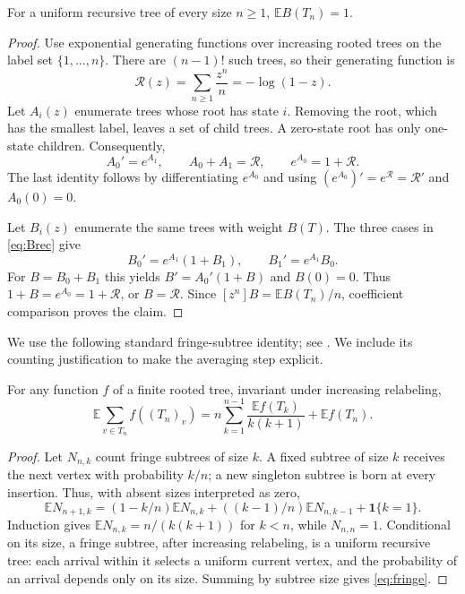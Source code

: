 \documentclass[runningheads,envcountsame,orivec]{llncs}
\newcommand{\E}{\mathbb E}
\newcommand{\ind}{\mathbf 1}
\newcommand{\R}{\mathcal R}
\begin{document}
\begin{lemma}\label{lem:influence}
For a uniform recursive tree of every size $n\ge1$, $\E B(T_n)=1$.
\end{lemma}
\begin{proof}
Use exponential generating functions over increasing rooted trees on
the label set $\{1,\ldots,n\}$. There are $(n-1)!$ such trees, so their
generating function is
\[
 \R(z)=\sum_{n\ge1}\frac{z^n}{n}=-\log(1-z).
\]
Let $A_i(z)$ enumerate trees whose root has state $i$. Removing the
root, which has the smallest label, leaves a set of child trees. A
zero-state root has only one-state children. Consequently,
\begin{equation}\label{eq:A}
 A_0'=e^{A_1},\qquad A_0+A_1=\R,
 \qquad e^{A_0}=1+\R.
\end{equation}
The last identity follows by differentiating $e^{A_0}$ and using
$(e^{A_0})'=e^{\R}=\R'$ and $A_0(0)=0$.

Let $B_i(z)$ enumerate the same trees with weight $B(T)$. The three
cases in \eqref{eq:Brec} give
\[
 B_0'=e^{A_1}(1+B_1),\qquad B_1'=e^{A_1}B_0.
\]
For $B=B_0+B_1$ this yields $B'=A_0'(1+B)$ and $B(0)=0$.
Thus $1+B=e^{A_0}=1+\R$, or $B=\R$. Since
$[z^n]B=\E B(T_n)/n$, coefficient comparison proves the claim.
\end{proof}

We use the following standard fringe-subtree identity; see
\cite{HolmgrenJanson2015}. We include its counting justification to make
the averaging step explicit.

\begin{lemma}\label{lem:fringe}
For any function $f$ of a finite rooted tree, invariant under increasing
relabeling,
\begin{equation}\label{eq:fringe}
 \E\sum_{v\in T_n}f((T_n)_v)
 =n\sum_{k=1}^{n-1}\frac{\E f(T_k)}{k(k+1)}+\E f(T_n).
\end{equation}
\end{lemma}
\begin{proof}
Let $N_{n,k}$ count fringe subtrees of size $k$. A fixed subtree of
size $k$ receives the next vertex with probability $k/n$; a new singleton
subtree is born at every insertion. Thus, with absent sizes interpreted
as zero,
\[
 \E N_{n+1,k}=(1-k/n)\E N_{n,k}
       +((k-1)/n)\E N_{n,k-1}+\ind\{k=1\}.
\]
Induction gives $\E N_{n,k}=n/(k(k+1))$ for $k<n$, while
$N_{n,n}=1$. Conditional on its size, a fringe subtree, after increasing
relabeling, is a uniform recursive tree: each arrival within it selects
a uniform current vertex, and the probability of an arrival depends
only on its size. Summing by subtree size gives \eqref{eq:fringe}.
\end{proof}
\end{document}
